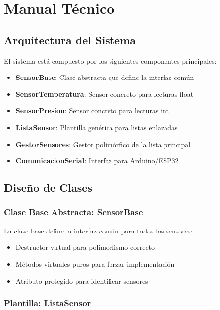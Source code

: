 \documentclass[12pt, spanish]{article}
\begin{document}
\section{Manual Técnico}

\subsection{Arquitectura del Sistema}

El sistema está compuesto por los siguientes componentes principales:

\begin{itemize}
    \item \textbf{SensorBase}: Clase abstracta que define la interfaz común
    \item \textbf{SensorTemperatura}: Sensor concreto para lecturas float
    \item \textbf{SensorPresion}: Sensor concreto para lecturas int
    \item \textbf{ListaSensor}: Plantilla genérica para listas enlazadas
    \item \textbf{GestorSensores}: Gestor polimórfico de la lista principal
    \item \textbf{ComunicacionSerial}: Interfaz para Arduino/ESP32
\end{itemize}

\subsection{Diseño de Clases}

\subsubsection{Clase Base Abstracta: SensorBase}

La clase base define la interfaz común para todos los sensores:
\begin{itemize}
    \item Destructor virtual para polimorfismo correcto
    \item Métodos virtuales puros para forzar implementación
    \item Atributo protegido para identificar sensores
\end{itemize}

\subsubsection{Plantilla: ListaSensor}
\end{document}
